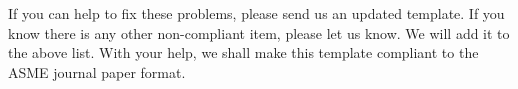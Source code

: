 \documentclass[twocolumn,10pt]{asme2ej}
\begin{document}
\noindent
If you can help to fix these problems, please send us an updated template.
If you know there is any other non-compliant item, please let us know.
We will add it to the above list.
With your help, we shall make this template 
compliant to the ASME journal paper format.


\begin{acknowledgment}

\end{acknowledgment}

%




\end{document}
